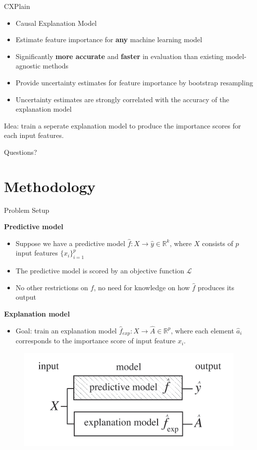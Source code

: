 \documentclass[10pt]{beamer}
\begin{document}
\begin{frame}{CXPlain}
\begin{itemize}
\item Causal Explanation Model
\item Estimate feature importance for \textbf{any} machine learning model
\item Significantly \textbf{more accurate} and \textbf{faster} in evaluation than existing model-agnostic methods
\item Provide uncertainty estimates for feature importance by bootstrap resampling
\item Uncertainty estimates are strongly correlated with the accuracy of the explanation model
\end{itemize}

Idea: train a seperate explanation model to produce the importance scores for each input features.
\end{frame}

\begin{frame}
\centering
\Huge Questions?
\end{frame}


\section{Methodology}
\begin{frame}{Problem Setup}

\textbf{Predictive model}

\begin{itemize}
\item Suppose we have a predictive model $\hat{f}: X \to \hat{y}\in\mathbb{R}^{k}$, where $X$ consists of $p$ input features $\{x_i\}_{i=1}^{p} $

\item The predictive model is scored by an objective function $\mathcal{L}$

\item No other restrictions on $\hat{f}$, no need for knowledge on how $\hat{f}$ produces its output

\end{itemize}

\textbf{Explanation model}
\begin{itemize}
\item Goal: train an explanation model $\hat{f}_{exp}: X\to \hat{A}\in \mathbb{R}^p $, where each element $\hat{a}_i $ corresponds to the importance score of input feature $x_i $.
\end{itemize}

\begin{figure}
\centering
\includegraphics[width=.5\textwidth]{figures/methodology/model structure.png}
\end{figure}
\end{frame}
\end{document}
